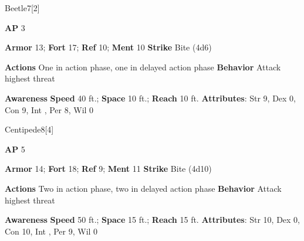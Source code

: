 \begin{monsection}[Dire]{Beetle}{7}[2]
\vspace{-1em}\vspace{-1em}
\begin{spellcontent}
\begin{spelltargetinginfo}
{\textbf{AP} 3}

\pari \textbf{Armor} 13;
\textbf{Fort} 17;
\textbf{Ref} 10;
\textbf{Ment} 10
\pari \textbf{Strike} Bite  (4d6)


\pari \textbf{Actions} One in action phase, one in delayed action phase
\pari \textbf{Behavior} Attack highest threat
\end{spelltargetinginfo}
\end{spellcontent}

\begin{monsterfooter}
\pari \textbf{Awareness} 
\pari \textbf{Speed} 40 ft.;
\textbf{Space} 10 ft.;
\textbf{Reach} 10 ft.
\pari \textbf{Attributes}:
Str 9,
Dex 0,
Con 9,
Int ,
Per 8,
Wil 0
\end{monsterfooter}
\end{monsection}





\begin{monsection}[Huge]{Centipede}{8}[4]
\vspace{-1em}\vspace{-1em}
\begin{spellcontent}
\begin{spelltargetinginfo}
{\textbf{AP} 5}

\pari \textbf{Armor} 14;
\textbf{Fort} 18;
\textbf{Ref} 9;
\textbf{Ment} 11
\pari \textbf{Strike} Bite  (4d10)


\pari \textbf{Actions} Two in action phase, two in delayed action phase
\pari \textbf{Behavior} Attack highest threat
\end{spelltargetinginfo}
\end{spellcontent}

\begin{monsterfooter}
\pari \textbf{Awareness} 
\pari \textbf{Speed} 50 ft.;
\textbf{Space} 15 ft.;
\textbf{Reach} 15 ft.
\pari \textbf{Attributes}:
Str 10,
Dex 0,
Con 10,
Int ,
Per 9,
Wil 0
\end{monsterfooter}
\end{monsection}




